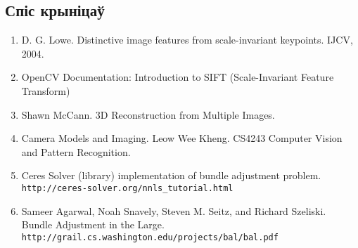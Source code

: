 \begin{center}
    \section*{Спіс крыніцаў}    
\end{center}

\begin{enumerate}
    \item D. G. Lowe. Distinctive image features from scale-invariant keypoints. IJCV, 2004.
    \item OpenCV Documentation: Introduction to SIFT (Scale-Invariant Feature Transform)
    \item Shawn McCann. 3D Reconstruction from Multiple Images.
    \item Camera Models and Imaging. Leow Wee Kheng. CS4243 Computer Vision and Pattern Recognition. 
    \item Ceres Solver (library) implementation of bundle adjustment problem. \verb|http://ceres-solver.org/nnls_tutorial.html|
    \item Sameer Agarwal, Noah Snavely, Steven M. Seitz, and Richard Szeliski. Bundle Adjustment in the Large.\\
    \verb|http://grail.cs.washington.edu/projects/bal/bal.pdf|
\end{enumerate}


\newpage
